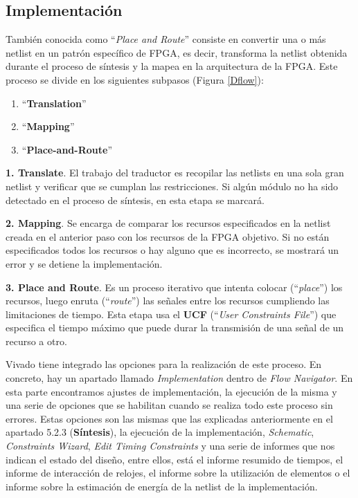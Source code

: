 \subsection{Implementación}
\renewcommand{\theenumi}{\arabic{enumi}}

También conocida como ``\textit{Place and Route}'' consiste en convertir una o más netlist en un patrón específico 
de FPGA, es decir, transforma la netlist obtenida durante el proceso de síntesis y la mapea en la arquitectura 
de la FPGA. Este proceso se divide en los siguientes subpasos (Figura \ref{Dflow}):

\begin{enumerate}
    \item ``\textbf{Translation}''
    \item ``\textbf{Mapping}''
    \item ``\textbf{Place-and-Route}''
\end{enumerate}

\textbf{1. Translate}. El trabajo del traductor es recopilar las netlists en una sola gran netlist y 
verificar que se cumplan las restricciones. Si algún módulo no ha sido detectado en el proceso de síntesis, 
en esta etapa se marcará.

\textbf{2. Mapping}. Se encarga de comparar los recursos especificados en la netlist creada en el anterior paso 
con los recursos de la FPGA objetivo. Si no están especificados todos los recursos o hay alguno que es 
incorrecto, se mostrará un error y se detiene la implementación.

\textbf{3. Place and Route}. Es un proceso iterativo que intenta colocar (``\textit{place}'') los recursos, luego 
enruta (``\textit{route}'') las señales entre los recursos cumpliendo las limitaciones de tiempo. Esta etapa 
usa el \textbf{UCF} (``\textit{User Constraints File}'') que especifica el tiempo máximo que puede durar 
la transmisión de una señal de un recurso a otro.

Vivado tiene integrado las opciones para la realización de este proceso. En concreto, hay un apartado llamado 
\textit{Implementation} dentro de \textit{Flow Navigator}. En esta parte encontramos ajustes de implementación, 
la ejecución de la misma y una serie de opciones que se habilitan cuando se realiza todo este proceso sin errores. 
Estas opciones son las mismas que las explicadas anteriormente en el apartado 5.2.3 (\textbf{Síntesis}), la ejecución de 
la implementación, \textit{Schematic}, \textit{Constraints Wizard}, \textit{Edit Timing Constraints} y  
una serie de informes que nos indican el estado del diseño, entre ellos, está el informe resumido de tiempos, 
el informe de interacción de relojes, el informe sobre la utilización de elementos o el informe sobre la estimación 
de energía de la netlist de la implementación. 

